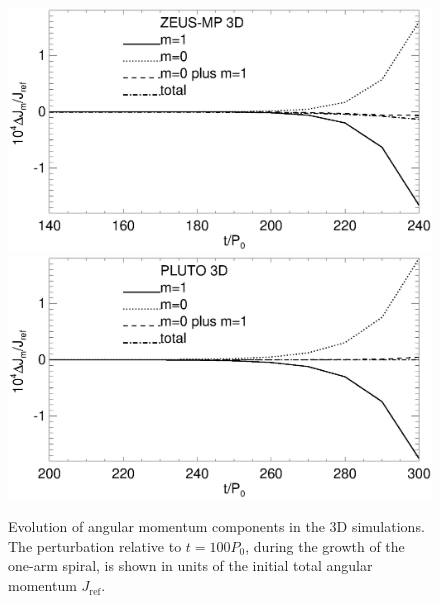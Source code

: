 \begin{figure}
  \includegraphics[scale=.41,clip=true,trim=0cm 1cm 0cm 0cm]{figures/nonaxi_evol_ang_zeus}
  \includegraphics[scale=.41]{figures/nonaxi_evol_ang_pluto}
  \caption{Evolution of angular momentum components in the 3D 
    simulations. The perturbation 
    relative to $t=100P_0$, during the growth of the one-arm spiral,
    is shown in units of the initial total angular momentum
    $J_\mathrm{ref}$.\label{3d_angmom}}  
\end{figure}   

